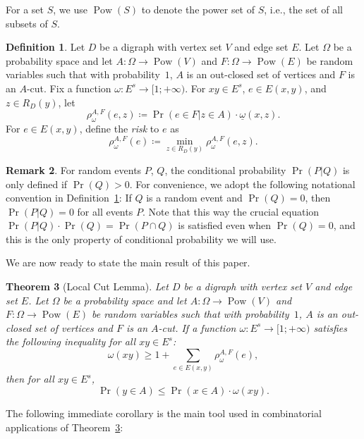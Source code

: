 \documentclass[10pt]{article}
\numberwithin{equation}{subsection}
\newtheorem{theo}{Theorem}[section]
\theoremstyle{definition}
\newtheorem{defn}[theo]{Definition}
\newtheorem{remk}[theo]{Remark}
\newcommand{\powerset}[1]{\operatorname{Pow}(#1)}
\begin{document}
	For a set $S$, we use $\powerset{S}$ to denote the power set of $S$, i.e., the set of all subsets of $S$.
	
	\begin{defn}\label{defn:risk}
		Let $D$ be a digraph with vertex set $V$ and edge set $E$. Let $\Omega$ be a probability space and let $A \colon \Omega \to \powerset{V}$ and $F \colon \Omega \to \powerset{E}$ be random variables such that with probability~$1$, $A$ is an out-closed set of vertices and $F$ is an $A$-cut. Fix a function $\omega \colon E^s \to [1; +\infty)$. For $xy \in E^s$, $e \in E(x,y)$, and $z \in R_D(y)$, let
		$$
			\rho^{A,F}_\omega(e, z) \coloneqq \Pr(e \in F \vert z \in A) \cdot \underline{\omega}(x, z).
		$$
		For $e \in E(x,y)$, define the \emph{risk} to $e$ as
		$$
			\rho^{A, F}_\omega(e) \coloneqq \min_{z \in R_D(y)} \rho^{A, F}_\omega(e, z).
		$$
	\end{defn}
	
	\begin{remk}\label{remk:cond_prob}
		For random events $P$, $Q$, the conditional probability $\Pr(P\vert Q)$ is only defined if $\Pr(Q) > 0$. For convenience, we adopt the following notational convention in Definition~\ref{defn:risk}: If $Q$ is a random event and $\Pr(Q) = 0$, then $\Pr(P\vert Q) = 0$ for all events $P$. Note that this way the crucial equation $\Pr(P \vert Q) \cdot \Pr(Q) = \Pr(P \cap Q)$ is satisfied even when $\Pr(Q) = 0$, and this is the only property of conditional probability we will use.
	\end{remk}
	
	We are now ready to state the main result of this paper.
	
	\begin{theo}[Local Cut Lemma]\label{theo:main}
		Let $D$ be a digraph with vertex set $V$ and edge set $E$. Let $\Omega$ be a probability space and let $A \colon \Omega \to \powerset{V}$ and $F \colon \Omega \to \powerset{E}$ be random variables such that with probability~$1$, $A$ is an out-closed set of vertices and $F$ is an $A$-cut. If a function $\omega \colon E^s \to [1; +\infty)$ satisfies the following inequality for all $xy \in E^s$:
		\begin{equation}\label{eq:main}
			\omega(xy) \geq 1 + \sum_{e \in E(x,y)} \rho^{A,F}_\omega(e),
		\end{equation}
		then for all $xy \in E^s$,
		$$
			\Pr(y \in A) \leq \Pr(x \in A) \cdot\omega(xy).
		$$
	\end{theo}
	
	The following immediate corollary is the main tool used in combinatorial applications of Theorem~\ref{theo:main}:
	
\end{document}
